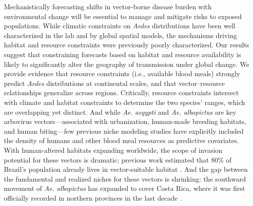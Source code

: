 Mechanistically forecasting shifts in vector-borne disease burden with environmental change will be essential to manage and mitigate risks to exposed populations. While climatic constraints on \textit{Aedes} distributions have been well characterized in the lab and by global spatial models, the mechanisms driving habitat and resource constraints were previously poorly characterized. Our results suggest that constraining forecasts based on habitat and resource availability is likely to significantly alter the geography of transmission under global change. We provide evidence that resource constraints (i.e., available blood meals) strongly predict \textit{Aedes} distributions at continental scales, and that vector–resource relationships generalize across regions. Critically, resource constraints intersect with climate and habitat constraints to determine the two species’ ranges, which are overlapping yet distinct. And while \textit{Ae. aegypti} and \textit{Ae. albopictus} are key arbovirus vectors—associated with urbanization, human-made breeding habitats, and human biting—few previous niche modeling studies have explicitly included the density of humans and other blood meal resources as predictive covariates. With human-altered habitats expanding worldwide, the scope of invasion potential for these vectors is dramatic; previous work estimated that 80\% of Brazil’s population already lives in vector-suitable habitat \cite{Cardoso-Leite2014-uq}. And the gap between the fundamental and realized niches for these vectors is shrinking: the southward movement of \textit{Ae. albopictus} has expanded to cover Costa Rica, where it was first officially recorded in northern provinces in the last decade \cite{Calderon_Arguedas2012-bf, Marin_Rodriguez2014-ww}.

